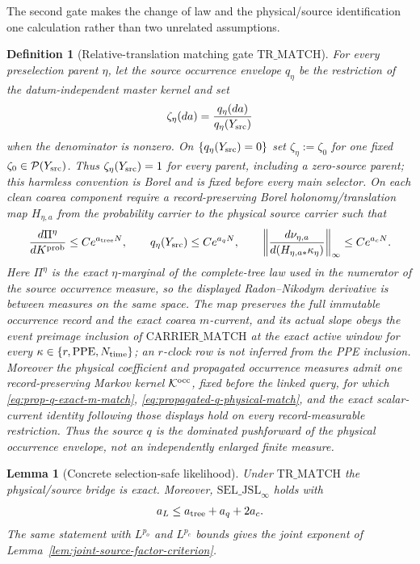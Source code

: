 \documentclass[11pt]{article}
\newtheorem{lemma}[theorem]{Lemma}
\newtheorem{definition}[theorem]{Definition}
\begin{document}
The second gate makes the change of law and the physical/source
identification one calculation rather than two unrelated assumptions.

\begin{definition}[Relative-translation matching gate
$\mathrm{TR\_MATCH}$]
\label{def:translation-match}
For every preselection parent $\eta$, let the source occurrence envelope
$q_\eta$ be the restriction of the datum-independent master kernel and set
\begin{equation}
\label{eq:translation-proposal}
 \zeta_\eta(da)=\frac{q_\eta(da)}{q_\eta(Y_{\rm src})}
\end{equation}
when the denominator is nonzero.  On
$\{q_\eta(Y_{\rm src})=0\}$ set $\zeta_\eta:=\zeta_0$ for one fixed
$\zeta_0\in\mathcal P(Y_{\rm src})$.  Thus
$\zeta_\eta(Y_{\rm src})=1$ for every parent, including a zero-source
parent; this harmless convention is Borel and is fixed before every main
selector.  On each clean coarea component require a record-preserving Borel
holonomy/translation map $H_{\eta,a}$ from the probability carrier to the
physical source carrier such that
\begin{equation}
\label{eq:translation-match-bounds}
 \frac{d\Pi^{\eta}}{dK^{\rm prob}}\le Ce^{a_{\rm tree}N},\qquad
 q_\eta(Y_{\rm src})\le Ce^{a_qN},\qquad
 \left\|\frac{d\nu_{\eta,a}}
 {d(H_{\eta,a*}\kappa_\eta)}\right\|_\infty
 \le Ce^{a_cN}.
\end{equation}
Here $\Pi^{\eta}$ is the exact $\eta$-marginal of the complete-tree law
used in the numerator of the source occurrence measure, so the displayed
Radon--Nikodym derivative is between measures on the same space.
The map preserves the full immutable occurrence record and the exact
coarea $m$-current, and its actual slope obeys the event preimage inclusion
of $\mathrm{CARRIER\_MATCH}$ at the exact active window for every
$\kappa\in\{r,\mathrm{PPE},N_{\rm time}\}$; an $r$-clock row is not inferred
from the PPE inclusion.  Moreover the physical coefficient and propagated
occurrence measures admit one record-preserving Markov kernel
$\mathcal K^{\rm occ}$, fixed before the linked query, for which
\eqref{eq:prop-q-exact-m-match},
\eqref{eq:propagated-q-physical-match}, and the exact scalar-current
identity following those displays hold on every record-measurable
restriction.  Thus the source $q$ is the dominated pushforward of the
physical occurrence envelope, not an independently enlarged finite
measure.
\end{definition}

\begin{lemma}[Concrete selection-safe likelihood]
\label{lem:translation-match-implies-jsl}
Under $\mathrm{TR\_MATCH}$ the physical/source bridge is exact.  Moreover,
$\mathrm{SEL\_JSL}_\infty$ holds with
\begin{equation}
\label{eq:translation-likelihood-loss}
 a_L\le a_{\rm tree}+a_q+2a_c.
\end{equation}
The same statement with $L^{p_o}$ and $L^{p_c}$ bounds gives the joint
exponent of Lemma~\ref{lem:joint-source-factor-criterion}.
\end{lemma}
\end{document}
